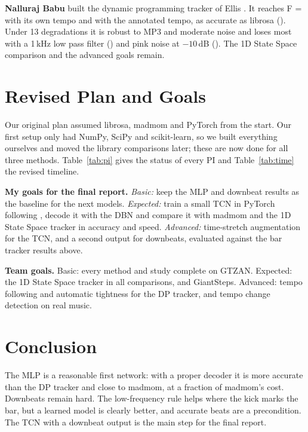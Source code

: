 \documentclass{article}
\begin{document}
\textbf{Nalluraj Babu} built the dynamic programming tracker of Ellis \cite{ellis}. It reaches F = \DPF{} with its own tempo and \DPOracleF{} with the annotated tempo, as accurate as librosa (\LibF{}). Under 13 degradations it is robust to MP3 and moderate noise and loses most with a 1\,kHz low pass filter (\DegLPOne{}) and pink noise at $-10$\,dB (\DegNoiseMinusTen{}). The 1D State Space comparison and the advanced goals remain.

\PITable
\TimelineTable

\section{Revised Plan and Goals}

Our original plan assumed librosa, madmom and PyTorch from the start. Our first setup only had NumPy, SciPy and scikit-learn, so we built everything ourselves and moved the library comparisons later; these are now done for all three methods. Table~\ref{tab:pi} gives the status of every PI and Table~\ref{tab:time} the revised timeline.

\textbf{My goals for the final report.}
\emph{Basic:} keep the MLP and downbeat results as the baseline for the next models.
\emph{Expected:} train a small TCN in PyTorch following \cite{tcn}, decode it with the DBN and compare it with madmom and the 1D State Space tracker \cite{heydari} in accuracy and speed.
\emph{Advanced:} time-stretch augmentation for the TCN, and a second output for downbeats, evaluated against the bar tracker results above.

\textbf{Team goals.} Basic: every method and study complete on GTZAN. Expected: the 1D State Space tracker in all comparisons, and GiantSteps. Advanced: tempo following and automatic tightness for the DP tracker, and tempo change detection on real music.

\section{Conclusion}

The MLP is a reasonable first network: with a proper decoder it is more accurate than the DP tracker and close to madmom, at a fraction of madmom's cost. Downbeats remain hard. The low-frequency rule helps where the kick marks the bar, but a learned model is clearly better, and accurate beats are a precondition. The TCN with a downbeat output is the main step for the final report.


\end{document}

